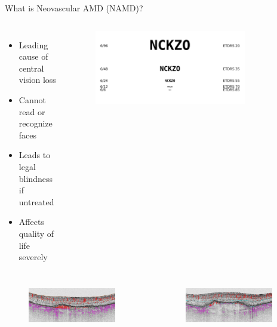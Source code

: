 \documentclass[10pt,aspectratio=169]{beamer}
\begin{document}
\begin{frame}{What is Neovascular AMD (NAMD)?}
\begin{columns}[T]
\begin{itemize}
    \item Leading cause of central vision loss
    \item Cannot read or recognize faces
    \item Leads to legal blindness if untreated
    \item Affects quality of life severely
\end{itemize}

\begin{figure}
    \centering
    \includegraphics[width=0.8\textwidth]{logMAR_chart_explainer.png}
\end{figure}
\end{columns}

\vspace{0.5cm}
\begin{columns}[T]
\begin{figure}
    \centering
    \includegraphics[width=0.9\textwidth]{early-namd-b-scan.png}
\end{figure}

\begin{figure}
    \centering
    \includegraphics[width=0.9\textwidth]{later-namd-b-scan.png}
\end{figure}
\end{columns}
\end{frame}
\end{document}
